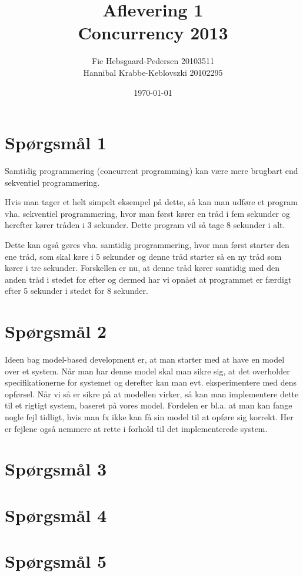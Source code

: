 \documentclass[a4paper,10p,danish]{article}
\begin{document}
\title{Aflevering 1 \\ Concurrency 2013}
\date{\today}
\author{Fie Hebsgaard-Pedersen 20103511 \\ Hannibal Krabbe-Keblovszki 20102295}
\maketitle
\thispagestyle{empty}
\section*{Spørgsmål 1}
Samtidig programmering (concurrent programming) kan være mere brugbart end sekventiel programmering.

Hvis man tager et helt simpelt eksempel på dette, så kan man udføre et program vha. sekventiel programmering, hvor man først kører en tråd i fem sekunder og herefter kører tråden i 3 sekunder. Dette program vil så tage 8 sekunder i alt.

Dette kan også gøres vha. samtidig programmering, hvor man først starter den ene tråd, som skal køre i 5 sekunder og denne tråd starter så en ny tråd som kører i tre sekunder. Forskellen er nu, at denne tråd kører samtidig med den anden tråd i stedet for efter og dermed har vi opnået at programmet er færdigt efter 5 sekunder i stedet for 8 sekunder. 
\section*{Spørgsmål 2}
Ideen bag model-based development er, at man starter med at have en model over et system.  Når man har denne model skal man sikre sig, at det overholder specifikationerne for systemet og derefter kan man evt. eksperimentere med dens opførsel. Når vi så er sikre på at modellen virker, så kan man implementere dette til et rigtigt system, baseret på vores model.
Fordelen er bl.a. at man kan fange nogle fejl tidligt, hvis man fx ikke kan få sin model til at opføre sig korrekt. Her er fejlene også nemmere at rette i forhold til det implementerede system.
\section*{Spørgsmål 3}


\section*{Spørgsmål 4}
\section*{Spørgsmål 5}
\end{document}
